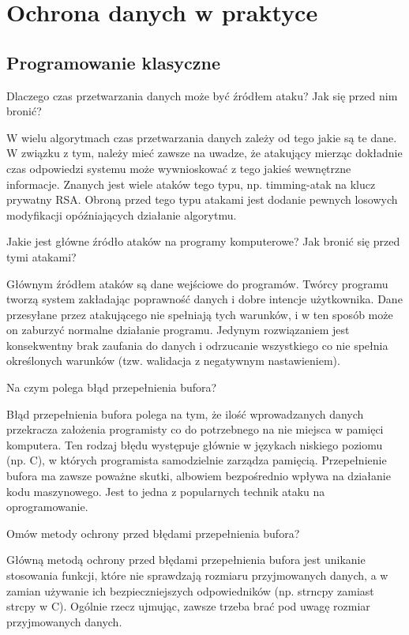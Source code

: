 \documentclass[answers,11pt]{exam}
\begin{document}
\section{Ochrona danych w praktyce}

\subsection{Programowanie klasyczne}
\begin{questions}

\question Dlaczego czas przetwarzania danych może być źródłem ataku? Jak się przed nim bronić?
\begin{solution}
W wielu algorytmach czas przetwarzania danych zależy od tego jakie są te dane. W związku z tym, należy mieć zawsze na uwadze, że atakujący mierząc dokładnie czas odpowiedzi systemu może wywnioskować z tego jakieś wewnętrzne informacje. Znanych jest wiele ataków tego typu, np. timming-atak na klucz prywatny RSA.
Obroną przed tego typu atakami jest dodanie pewnych losowych modyfikacji opóźniających działanie algorytmu.  
\end{solution}

\question Jakie jest główne źródło ataków na programy komputerowe? Jak bronić się przed tymi atakami?
\begin{solution}
Głównym źródłem ataków są dane wejściowe do programów. Twórcy programu tworzą system zakładając poprawność danych i dobre intencje użytkownika. Dane przesyłane przez atakującego nie spełniają tych warunków, i w ten sposób może on zaburzyć normalne działanie programu. 
Jedynym rozwiązaniem jest konsekwentny brak zaufania do danych i odrzucanie wszystkiego co nie spełnia określonych warunków (tzw. walidacja z negatywnym nastawieniem).
\end{solution}


\question Na czym polega błąd przepełnienia bufora?
\begin{solution}
Błąd przepełnienia bufora polega na tym, że ilość wprowadzanych danych przekracza założenia programisty co do potrzebnego na nie miejsca w pamięci komputera. Ten rodzaj błędu występuje głównie w językach niskiego poziomu (np. C), w których programista samodzielnie zarządza pamięcią. Przepełnienie bufora ma zawsze poważne skutki, albowiem bezpośrednio wpływa na działanie kodu maszynowego. Jest to jedna z popularnych technik ataku na oprogramowanie. 
\end{solution}

\question Omów metody ochrony przed błędami przepełnienia bufora?
\begin{solution}
Główną metodą ochrony przed błędami przepełnienia bufora jest unikanie stosowania funkcji, które nie sprawdzają rozmiaru przyjmowanych danych, a w zamian używanie ich bezpieczniejszych odpowiedników (np. strncpy zamiast strcpy w C). Ogólnie rzecz ujmując, zawsze trzeba brać pod uwagę rozmiar przyjmowanych danych.
\end{solution}


\end{questions}
\end{document}
